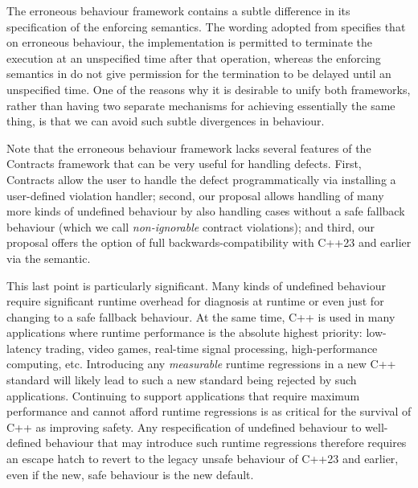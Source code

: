 The erroneous behaviour framework contains a subtle difference in its specification of the enforcing semantics. The wording adopted from \cite{P2795R5} specifies that on erroneous behaviour, the implementation is permitted to terminate the execution at an unspecified time after that operation, whereas the enforcing semantics in \cite{P2900R7} do not give permission for the termination to be delayed until an unspecified time. One of the reasons why it is desirable to unify both frameworks, rather than having two separate mechanisms for achieving essentially the same thing, is that we can avoid such subtle divergences in behaviour.

Note that the erroneous behaviour framework lacks several features of the Contracts framework that can be very useful for handling defects. First, Contracts allow the user to handle the defect programmatically via installing a user-defined violation handler; second, our proposal allows handling of many more kinds of undefined behaviour by also handling cases without a safe fallback behaviour (which we call \emph{non-ignorable} contract violations); and third, our proposal offers the option of full backwards-compatibility with C++23 and earlier via the  semantic.

This last point is particularly significant. Many kinds of undefined behaviour require significant runtime overhead for diagnosis at runtime or even just for changing to a safe fallback behaviour. At the same time, C++ is used in many applications where runtime performance is the absolute highest priority: low-latency trading, video games, real-time signal processing, high-performance computing, etc. Introducing any \emph{measurable} runtime regressions in a new C++ standard will likely lead to such a new standard being rejected by such applications. Continuing to support applications that require maximum performance and cannot afford runtime regressions is as critical for the survival of C++ as improving safety. Any respecification of undefined behaviour to well-defined behaviour that may introduce such runtime regressions therefore requires an escape hatch to revert to the legacy unsafe behaviour of C++23 and earlier, even if the new, safe behaviour is the new default.

